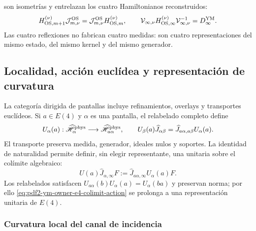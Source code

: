 son isometrías y entrelazan los cuatro Hamiltonianos reconstruidos:
\begin{equation}\label{eq:pdf2-ym-owner-common-os-hamiltonian}
 H_{{\rm OS},m+1}^{(\nu)}\mathcal J_{m,\nu}^{\rm OS}
 =\mathcal J_{m,\nu}^{\rm OS}H_{{\rm OS},m}^{(\nu)},
 \qquad
 \mathcal V_{\infty,\nu}H_{{\rm OS},\infty}^{(\nu)}
 \mathcal V_{\infty,\nu}^{-1}=D_\infty^{\rm YM}.
\end{equation}
Las cuatro reflexiones no fabrican cuatro medidas: son cuatro representaciones del mismo
estado, del mismo kernel y del mismo generador.

\subsection{Localidad, acción euclídea y representación de curvatura}

La categoría dirigida de pantallas incluye refinamientos, overlays y transportes
euclídeos. Si $a\in E(4)$ y $\alpha$ es una pantalla, el relabelado completo define
\begin{equation}\label{eq:pdf2-ym-owner-e4-finite-transport}
 U_\alpha(a):\widehat{\mathscr H}_\alpha^{\rm phys}
 \longrightarrow\widehat{\mathscr H}_{a\alpha}^{\rm phys},
 \qquad
 U_\beta(a)\widehat J_{\alpha\beta}
 =\widehat J_{a\alpha,a\beta}U_\alpha(a).
\end{equation}
El transporte preserva medida, generador, ideales nulos y soportes. La identidad de
naturalidad permite definir, sin elegir representante, una unitaria sobre el colímite
algebraico:
\begin{equation}\label{eq:pdf2-ym-owner-e4-colimit-action}
 U(a)\widehat J_{\alpha,\infty}F
 :=\widehat J_{a\alpha,\infty}U_\alpha(a)F.
\end{equation}
Los relabelados satisfacen $U_{a\alpha}(b)U_\alpha(a)=U_\alpha(ba)$ y preservan
norma; por ello \eqref{eq:pdf2-ym-owner-e4-colimit-action} se prolonga a una
representación unitaria de $E(4)$.

\subsubsection{Curvatura local del canal de incidencia}


